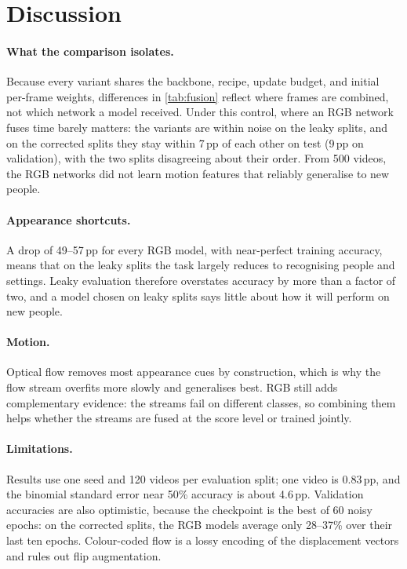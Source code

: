 \section{Discussion}
\label{sec:discussion}
\paragraph{What the comparison isolates.}
Because every variant shares the backbone, recipe, update budget, and
initial per-frame weights, differences in \cref{tab:fusion} reflect where
frames are combined, not which network a model received. Under this control, where an
RGB network fuses time barely matters: the variants are within noise on the
leaky splits, and on the corrected splits they stay within 7\,pp of each
other on test (9\,pp on validation), with the two splits disagreeing about
their order. From 500
videos, the RGB networks did not learn motion features that reliably
generalise to new people.

\paragraph{Appearance shortcuts.}
A drop of 49--57\,pp for every RGB model, with near-perfect training
accuracy, means that on the leaky splits the task largely reduces to
recognising people and settings. Leaky evaluation therefore overstates
accuracy by more than a factor of two, and a model chosen on leaky splits
says little about how it will perform on new people.

\paragraph{Motion.}
Optical flow removes most appearance cues by construction, which is why the
flow stream overfits more slowly and generalises best. RGB still adds
complementary evidence: the streams fail on different classes, so combining
them helps whether the streams are fused at the score level or trained
jointly.

\paragraph{Limitations.}
Results use one seed and 120 videos per evaluation split; one video is
0.83\,pp, and the binomial standard error near 50\% accuracy is about
4.6\,pp. Validation accuracies are also optimistic, because the checkpoint
is the best of 60 noisy epochs: on the corrected splits, the RGB models
average only 28--37\% over their last ten epochs. Colour-coded flow is a lossy encoding of
the displacement vectors and rules out flip augmentation.

